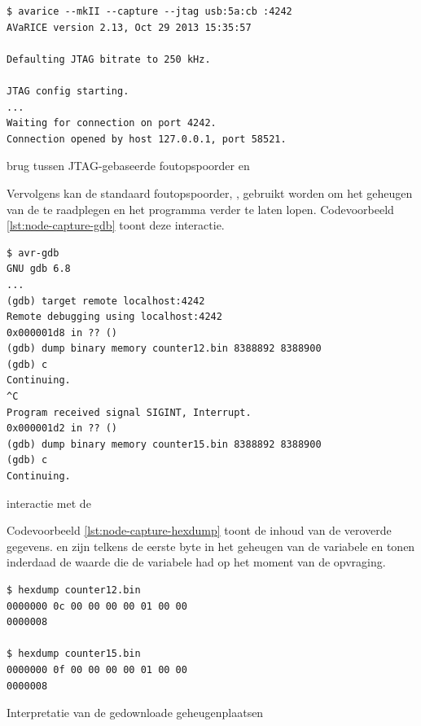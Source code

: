 \begin{listing}[ht]
  \begin{verbatim}
$ avarice --mkII --capture --jtag usb:5a:cb :4242
AVaRICE version 2.13, Oct 29 2013 15:35:57

Defaulting JTAG bitrate to 250 kHz.

JTAG config starting.
...
Waiting for connection on port 4242.
Connection opened by host 127.0.0.1, port 58521.
  \end{verbatim}
  \vspace{-5mm}
  \caption{ brug tussen JTAG-gebaseerde foutopspoorder en }
  \label{lst:node-capture-avarice}
\end{listing}

Vervolgens kan de standaard foutopspoorder, , gebruikt worden om het
geheugen van de \mcu te raadplegen en het programma verder te laten lopen.
Codevoorbeeld \ref{lst:node-capture-gdb} toont deze interactie.

\begin{listing}[ht]
  \begin{verbatim}
$ avr-gdb
GNU gdb 6.8
...
(gdb) target remote localhost:4242
Remote debugging using localhost:4242
0x000001d8 in ?? ()
(gdb) dump binary memory counter12.bin 8388892 8388900
(gdb) c
Continuing.
^C
Program received signal SIGINT, Interrupt.
0x000001d2 in ?? ()
(gdb) dump binary memory counter15.bin 8388892 8388900
(gdb) c
Continuing.
  \end{verbatim}
  \vspace{-5mm}
  \caption{ interactie met de \mcu}
  \label{lst:node-capture-gdb}
\end{listing}

Codevoorbeeld \ref{lst:node-capture-hexdump} toont de inhoud van de veroverde
gegevens.  en  zijn telkens de eerste byte in het geheugen van
de  variabele en tonen inderdaad de waarde die de variabele had op
het moment van de opvraging.

\begin{listing}[ht]
  \begin{verbatim}
$ hexdump counter12.bin 
0000000 0c 00 00 00 00 01 00 00                        
0000008

$ hexdump counter15.bin 
0000000 0f 00 00 00 00 01 00 00                        
0000008
  \end{verbatim}
  \vspace{-5mm}
  \caption{Interpretatie van de gedownloade geheugenplaatsen}
  \label{lst:node-capture-hexdump}
\end{listing}

